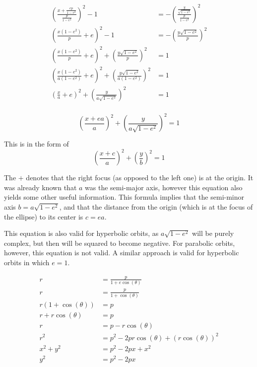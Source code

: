 \documentclass{article}
\begin{document}
\begin{align*}
    \left(\frac{x+\frac{ep}{1-e^2}}{\frac{p}{1-e^2}}\right)^2-1                                & =-\left(\frac{\frac{y}{\sqrt{1-e^2}}}{\frac{p}{1-e^2}}\right)^2 \\
    \left(\frac{x(1-e^2)}{p}+e\right)^2-1                                                      & =-\left(\frac{y\sqrt{1-e^2}}{p}\right)^2                        \\
    \left(\frac{x(1-e^2)}{p}+e\right)^2+\left(\frac{y\sqrt{1-e^2}}{p}\right)^2                 & =1                                                              \\
    \left(\frac{x(1-e^2)}{a(1-e^2)}+e\right)^2+\left(\frac{y\sqrt{1-e^2}}{a(1-e^2)}\right)^2   & =1                                                              \\
    \left(\frac{x}{a}+e\right)^2+\left(\frac{y}{a\sqrt{1-e^2}}\right)^2                        & =1                                                              \\
\end{align*}

\begin{equation}\label{Orbit Cartesian}
    \left(\frac{x+ea}{a}\right)^2+\left(\frac{y}{a\sqrt{1-e^2}}\right)^2=1
\end{equation}

This is in the form of
$$\left(\frac{x+c}{a}\right)^2+\left(\frac{y}{b}\right)^2=1$$

The $+$ denotes that the right focus (as opposed to the left one) is at the origin. It was already known that $a$ was the semi-major axis, however this equation also yields some other useful information. This formula implies that the semi-minor axis $b=a\sqrt{1-e^2}$, and that the distance from the origin (which is at the focus of the ellipse) to its center is $c=ea$.

This equation is also valid for hyperbolic orbits, as $a\sqrt{1-e^2}$ will be purely complex, but then will be squared to become negative. For parabolic orbits, however, this equation is not valid. A similar approach is valid for hyperbolic orbits in which $e=1$.

\begin{align*}
    r                 & =\frac{p}{1+e\cos(\theta)}              \\
    r                 & =\frac{p}{1+\cos(\theta)}               \\
    r(1+\cos(\theta)) & = p                                     \\
    r+r\cos(\theta)   & = p                                     \\
    r                 & = p-r\cos(\theta)                       \\
    r^2               & = p^2-2pr\cos(\theta)+(r\cos(\theta))^2 \\
    x^2+y^2           & = p^2-2px+x^2                           \\
    y^2               & = p^2-2px                               \\
\end{align*}
\end{document}
